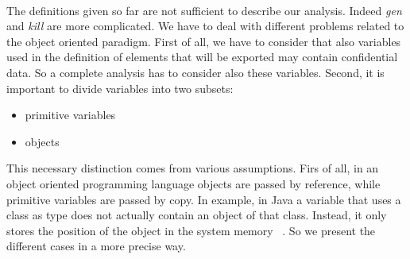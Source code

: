 \documentclass[letterpaper,twocolumn,10pt]{article}
\begin{document}
\paragraph{}
The definitions given so far are not sufficient to describe our analysis. Indeed \emph{gen} and \emph{kill} are more complicated. We have to deal with different problems related to the object oriented paradigm. First of all, we have to consider that also variables used in the definition of elements that will be exported may contain confidential data. So a complete analysis has to consider also these variables.
Second, it is important to divide variables into two subsets:
\begin{itemize}
\item primitive variables
\item objects
\end{itemize}
This necessary distinction comes from various assumptions. Firs of all, in an object oriented programming language objects are passed by reference, while primitive variables are passed by copy. In example, in Java a variable that uses a class as type does not actually contain an object of that class. Instead, it only stores the position of the object in the system memory ~\cite{Horstmann:2008:BJ:1796502}. So we present the different cases in a more precise way.
\end{document}

